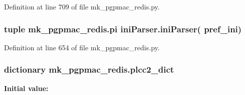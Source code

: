 Definition at line 709 of file mk\-\_\-pgpmac\-\_\-redis.\-py.

\hypertarget{namespacemk__pgpmac__redis_a2f5bbda0250eecd94d166dc0a2fbff86}{
\subsubsection[{pi}]{\setlength{\rightskip}{0pt plus 5cm}tuple mk\-\_\-pgpmac\-\_\-redis.\-pi {\bf ini\-Parser.\-ini\-Parser}( {\bf pref\-\_\-ini})}}\label{namespacemk__pgpmac__redis_a2f5bbda0250eecd94d166dc0a2fbff86}


Definition at line 654 of file mk\-\_\-pgpmac\-\_\-redis.\-py.

\hypertarget{namespacemk__pgpmac__redis_a70d6a840305f17ce4f2936166fa2750e}{
\subsubsection[{plcc2\-\_\-dict}]{\setlength{\rightskip}{0pt plus 5cm}dictionary mk\-\_\-pgpmac\-\_\-redis.\-plcc2\-\_\-dict}}\label{namespacemk__pgpmac__redis_a70d6a840305f17ce4f2936166fa2750e}
{\bfseries Initial value\-:}
